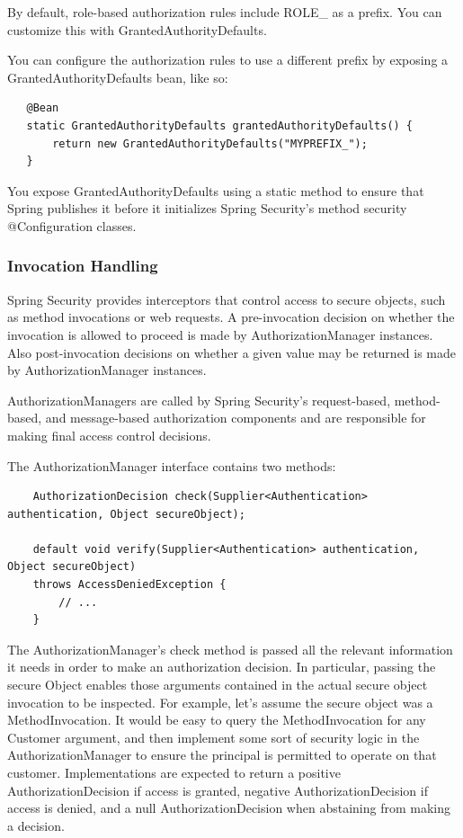 \documentclass{scrartcl}
\begin{document}
By default, role-based authorization rules include ROLE\_ as a prefix. You can customize this with GrantedAuthorityDefaults.

You can configure the authorization rules to use a different prefix by exposing a GrantedAuthorityDefaults bean, like so:

\begin{lstlisting}
   @Bean
   static GrantedAuthorityDefaults grantedAuthorityDefaults() {
       return new GrantedAuthorityDefaults("MYPREFIX_");
   }
\end{lstlisting}

You expose GrantedAuthorityDefaults using a static method to ensure that Spring publishes it before it initializes Spring Security’s method security @Configuration classes.

\subsubsection{Invocation Handling}

Spring Security provides interceptors that control access to secure objects, such as method invocations or web requests. A pre-invocation decision on whether the invocation is allowed to proceed is made by AuthorizationManager instances. Also post-invocation decisions on whether a given value may be returned is made by AuthorizationManager instances.

AuthorizationManagers are called by Spring Security’s request-based, method-based, and message-based authorization components and are responsible for making final access control decisions.

The AuthorizationManager interface contains two methods:

\begin{lstlisting}
    AuthorizationDecision check(Supplier<Authentication> authentication, Object secureObject);

    default void verify(Supplier<Authentication> authentication, Object secureObject)
    throws AccessDeniedException {
        // ...
    }
\end{lstlisting}

The AuthorizationManager's check method is passed all the relevant information it needs in order to make an authorization decision. In particular, passing the secure Object enables those arguments contained in the actual secure object invocation to be inspected. For example, let’s assume the secure object was a MethodInvocation. It would be easy to query the MethodInvocation for any Customer argument, and then implement some sort of security logic in the AuthorizationManager to ensure the principal is permitted to operate on that customer. Implementations are expected to return a positive AuthorizationDecision if access is granted, negative AuthorizationDecision if access is denied, and a null AuthorizationDecision when abstaining from making a decision.
\end{document}

